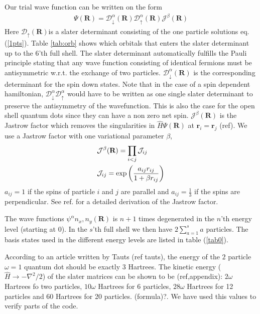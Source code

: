 \documentclass[a4paper,10pt,twocolumn]{article} %
\newcommand{\ts}[1]{\textbf{#1}}
\begin{document}
Our trial wave function can be written on the form
\begin{align}
	\Psi(\ts R) = \mathcal D_\downarrow^{\alpha}(\ts R) \mathcal D_\uparrow^\alpha(\ts R) \mathcal J^\beta(\ts R) 
\end{align}
Here $\mathcal D_\uparrow(\ts R)$is a slater determinant consisting of the one particle solutions eq. (\ref{1pts}). Table \ref{tab:orb} shows which orbitals that
enters the slater determinant up to the $6$'th full shell.
The slater determinant automatically fulfills the Pauli principle stating that any wave function consisting of identical fermions must be 
antisymmetric w.r.t. the exchange of two particles.
$\mathcal D_\downarrow^\alpha(\ts R)$ is the corresponding determinant for the spin down states. Note that in the case of a spin dependent hamiltonian,
$\mathcal D^\alpha_\downarrow \mathcal D^\alpha_\uparrow$ would have to be written as one single slater determinant to preserve the antisymmetry of the wavefunction.
This is also the case for the open shell quantum dots since they can have a non zero net spin.
$\mathcal J^\beta(\ts R)$ is the Jastrow factor which removes the singularities in $\hat H \Psi(\ts R)$ at $\ts r_i = \ts r_j$ (ref).
We use a Jastrow factor with one variational parameter $\beta$,
\begin{align}
	&\mathcal J^\beta(\ts R) = \prod_{i<j} \mathcal J_{ij}\notag\\
	&\mathcal J_{ij} = \exp\left( \frac {a_{ij}r_{ij}}{1+\beta r_{ij}} \right)
\end{align}
$a_{ij}=1$ if the spins of particle $i$ and $j$ are parallel and $a_{ij}=\frac13$ if the spins are perpendicular.
See ref. \cite{lars_eivind_thesis} for a detailed derivation of the Jastrow factor.

The wave functions $\psi^\alpha{n_x,n_y}(\ts R)$ is $n+1$ times degenerated in the $n$'th energy level (starting at $0$). 
In the $s$'th full shell we then have $2\sum_{a=1}^s a$ particles. The basis states used in the different energy levels are listed in table (\ref{tab0}).

According to an article written by Tauts (ref tauts), the energy of the $2$ particle $\omega=1$ quantum dot should be exactly $3$ Hartrees.
The kinetic energy ($\hat H\to -\nabla^2/2$) of the slater matrices can be shown to be (ref,appendix): $2\omega$ Hartrees fo two particles, $10\omega$ 
Hartrees for 6 particles, $28\omega$ Hartrees for 12 particles and $60$ Hartrees for 20 particles. (formula)?. We have used this values to verify parts of the code. 
\end{document}
